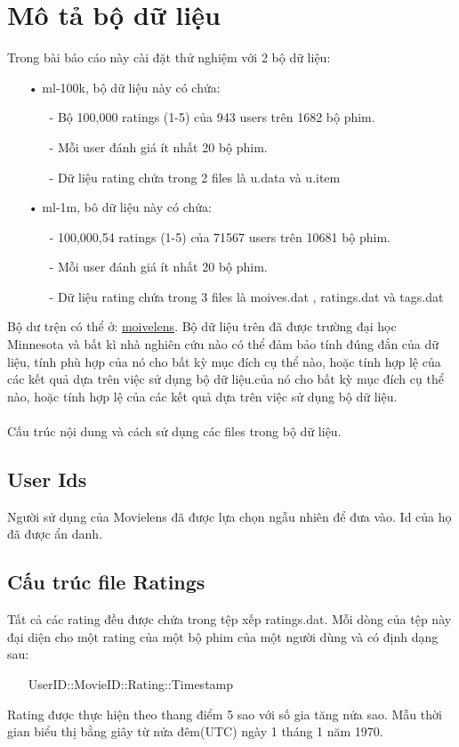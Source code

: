 \documentclass[a4paper,11pt]{report}
\begin{document}
\section{Mô tả bộ dữ liệu}
Trong bài báo cáo này cài đặt thử nghiệm với 2 bộ dữ liệu:
\begin{itemize}
\item[•] ml-100k, bộ dữ liệu này có chứa:
\begin{itemize}
\item[-] Bộ 100,000 ratings (1-5) của 943 users trên 1682 bộ phim.
\item[-] Mỗi user đánh giá ít nhất 20 bộ phim.
\item[-] Dữ liệu rating chứa trong 2 files là u.data và u.item
\end{itemize}
\item[•] ml-1m, bô dữ liệu này có chứa:
\begin{itemize}
\item[-] 100,000,54 ratings (1-5) của 71567 users trên 10681 bộ phim.
\item[-] Mỗi user đánh giá ít nhất 20 bộ phim.
\item[-] Dữ liệu rating chứa trong 3 files là moives.dat , ratings.dat và tags.dat
\end{itemize}
\end{itemize}
Bộ dư trện có thể ở: \href{https://grouplens.org/datasets/movielens/}{moivelens}. Bộ dữ liệu trên đã được trường đại học Minnesota và bất kì nhà nghiên cứu nào có thể đảm bảo tính đúng đắn của dữ liệu, tính phù hợp của nó cho bất kỳ mục đích cụ thể nào, hoặc tính hợp lệ của các kết quả dựa trên việc sử dụng bộ dữ liệu.của nó cho bất kỳ mục đích cụ thể nào, hoặc tính hợp lệ của các kết quả dựa trên việc sử dụng bộ dữ liệu.\\ \\
Cấu trúc nội dung và cách sử dụng các files trong bộ dữ liệu.
\subsection{User Ids}
Người sử dụng của Movielens đã được lựa chọn ngẫu nhiên để đưa vào. Id của họ đã được ẩn danh. 
\subsection{Cấu trúc file Ratings}
Tất cả các rating đều được chứa trong tệp xếp ratings.dat. Mỗi dòng của tệp này đại diện cho một rating của một bộ phim của một người dùng và có định dạng sau:
\begin{itemize}
\item[] UserID::MovieID::Rating::Timestamp
\end{itemize}
Rating được thực hiện theo thang điểm 5 sao với số gia tăng nửa sao. Mẫu thời gian biểu thị bằng giây từ nửa đêm(UTC) ngày 1 tháng 1 năm 1970.
\newpage
\end{document}
